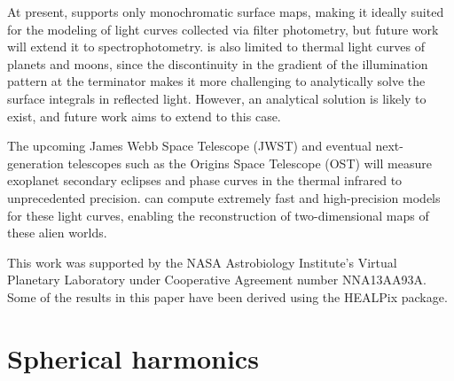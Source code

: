 \documentclass[modern]{aastex61}
\begin{document}
At present, \starry supports only
monochromatic surface maps, making it ideally suited for the modeling of
light curves collected via filter photometry, but future work will extend
it to spectrophotometry. \starry is also limited to thermal light curves of
planets and moons, since the discontinuity in the gradient of the
illumination pattern at the terminator makes it more challenging to analytically
solve the surface integrals in reflected light. However, an analytical solution
is likely to exist, and future work aims to extend \starry to this case.

The upcoming James Webb Space Telescope (JWST) and eventual
next-generation telescopes such as the Origins Space Telescope (OST) will
measure exoplanet secondary eclipses and
phase curves in the thermal infrared to unprecedented precision. \starry
can compute extremely fast and high-precision models for these
light curves, enabling the reconstruction of two-dimensional maps of these
alien worlds.


\acknowledgments
This work was supported by the NASA Astrobiology
Institute's Virtual Planetary Laboratory under Cooperative
Agreement number NNA13AA93A.
%
Some of the results in this paper have been derived using the HEALPix
\citep{Gorski2005} package.



%

%


\pagebreak
\appendix


\section{Spherical harmonics}
\label{app:spharm}
\end{document}
